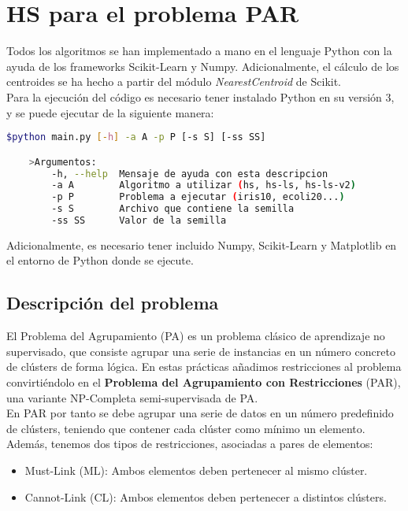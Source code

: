 \section{HS para el problema PAR}

Todos los algoritmos se han implementado a mano en el lenguaje Python con la ayuda de los frameworks Scikit-Learn y Numpy. Adicionalmente, el cálculo de los centroides se ha hecho a partir del módulo \textit{NearestCentroid} de Scikit. \\

Para la ejecución del código es necesario tener instalado Python en su versión 3, y se puede ejecutar de la siguiente manera:
\begin{lstlisting}[language=bash]
    $python main.py [-h] -a A -p P [-s S] [-ss SS]

    >Argumentos:
        -h, --help  Mensaje de ayuda con esta descripcion
        -a A        Algoritmo a utilizar (hs, hs-ls, hs-ls-v2)
        -p P        Problema a ejecutar (iris10, ecoli20...)
        -s S        Archivo que contiene la semilla
        -ss SS      Valor de la semilla    
\end{lstlisting}

\vspace{\baselineskip}

Adicionalmente, es necesario tener incluido Numpy, Scikit-Learn y Matplotlib en el entorno de Python donde se ejecute.

\newpage

\subsection{Descripción del problema}

El Problema del Agrupamiento (PA) es un problema clásico de aprendizaje no supervisado, que consiste agrupar una serie de instancias en un número concreto de clústers de forma lógica. En estas prácticas añadimos restricciones al problema convirtiéndolo en el \textbf{Problema del Agrupamiento con Restricciones} (PAR), una variante NP-Completa semi-supervisada de PA. \\

En PAR por tanto se debe agrupar una serie de datos en un número predefinido de clústers, teniendo que contener cada clúster como mínimo un elemento.
Además, tenemos dos tipos de restricciones, asociadas a pares de elementos:
\begin{itemize}
    \item Must-Link (ML): Ambos elementos deben pertenecer al mismo clúster.
    \item Cannot-Link (CL): Ambos elementos deben pertenecer a distintos clústers.
\end{itemize}

